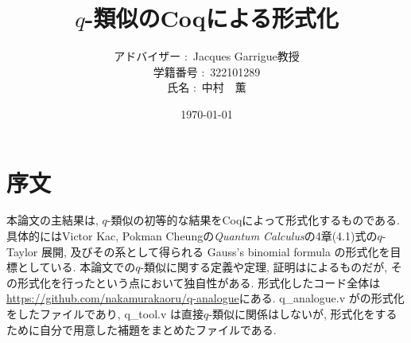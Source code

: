 \documentclass[11pt]{jsreport}
\theoremstyle{mystyle}
\newcommand{\0}{\textbf{0}}
\newcommand{\1}{\textbf{1}}
\newcommand{\2}{\textbf{2}}
\begin{document}
\title{$q$-類似のCoqによる形式化}
\author{アドバイザー $\colon$ Jacques Garrigue教授\\
           学籍番号 $\colon$ 322101289\\
           氏名 $\colon$ 中村　薫}
\date{\today}
\maketitle
\tableofcontents
\section*{序文}
本論文の主結果は, $q$-類似の初等的な結果をCoqによって形式化するものである. 具体的にはVictor Kac, Pokman Cheungの{\it Quantum Calculus}\cite{Kac}の4章(4.1)式の$q$-Taylor 展開, 及びその系として得られる Gauss's binomial formula の形式化を目標としている. 
本論文での$q$-類似に関する定義や定理, 証明は\cite{Kac}によるものだが, その形式化を行ったという点において独自性がある. 形式化したコード全体は\url{https://github.com/nakamurakaoru/q-analogue}\cite{coq qana}にある. q\_analogue.v が\cite{Kac}の形式化をしたファイルであり, q\_tool.v は直接$q$-類似に関係はしないが, 形式化をするために自分で用意した補題をまとめたファイルである. 
\end{document}
